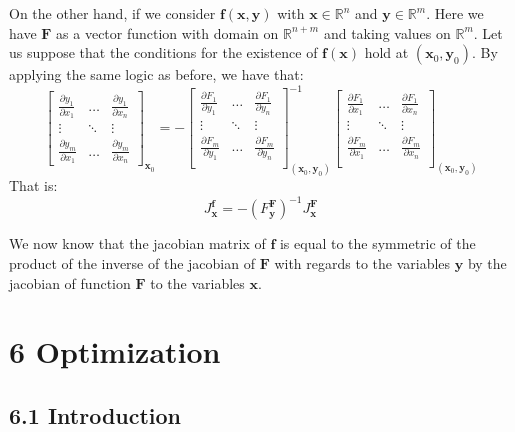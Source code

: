 \documentclass[0pt, a4paper]{article}
\begin{document}
On the other hand, if we consider $\textbf{f}(\textbf{x},\textbf{y})$ with $\textbf{x}\in\mathbb{R}^n$ and $\textbf{y}\in\mathbb{R}^m$. Here we have $\textbf{F}$ as a vector function with domain on $\mathbb{R}^{n+m}$ and taking values on $\mathbb{R}^m$. Let us suppose that the conditions for the existence of $\textbf{f}(\textbf{x})$ hold at $(\textbf{x}_0,\textbf{y}_0)$. By applying the same logic as before, we have that:
$$
\begin{bmatrix}
\frac{\partial y_1}{\partial x_1} & \dots & \frac{\partial y_1}{\partial x_n}\\ 
\vdots & \ddots & \vdots \\ 
\frac{\partial y_m}{\partial x_1} & \dots & \frac{\partial y_m}{\partial x_n}
\end{bmatrix}_{\textbf{x}_0}
= -
\begin{bmatrix}
\frac{\partial F_1}{\partial y_1} & \dots & \frac{\partial F_1}{\partial y_n}\\ 
\vdots & \ddots & \vdots \\ 
\frac{\partial F_m}{\partial y_1} & \dots & \frac{\partial F_m}{\partial y_n}\\ 
\end{bmatrix}^{-1}_{(\textbf{x}_0,\textbf{y}_0)}
\begin{bmatrix}
	\frac{\partial F_1}{\partial x_1} & \dots & \frac{\partial F_1}{\partial x_n}\\ 
	\vdots & \ddots & \vdots \\ 
	\frac{\partial F_m}{\partial x_1} & \dots & \frac{\partial F_m}{\partial x_n}\\ 
\end{bmatrix}_{(\textbf{x}_0,\textbf{y}_0)}
$$
That is:
$$J^\textbf{f}_\textbf{x}=-\left(F^\textbf{F}_\textbf{y}\right)^{-1}J^\textbf{F}_\textbf{x}$$

We now know that the jacobian matrix of $\textbf{f}$ is equal to the symmetric of the product of the inverse of the jacobian of $\textbf{F}$ with regards to the variables $\textbf{y}$ by the jacobian of function $\textbf{F}$ to the variables $\textbf{x}$.

\clearpage

\section*{6 Optimization}
\subsection*{6.1 Introduction}
\end{document}
